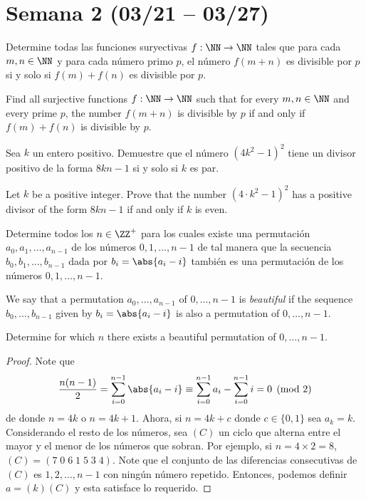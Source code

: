 \section{Semana 2 (03/21 -- 03/27)}


\begin{problem}
	Determine todas las funciones suryectivas $f:\NN\to\NN$ tales que para cada $m,n\in\NN$ y para cada número primo $p$, el número $f(m+n)$ es divisible por $p$ si y solo si $f(m)+f(n)$ es divisible por $p$.
	\begin{hint}
		Find all surjective functions $f:\NN\to\NN$ such that for every $m,n\in\NN$ and every prime $p$, the number $f(m+n)$ is divisible by $p$ if and only if $f(m)+f(n)$ is divisible by $p$.
	\end{hint}
\end{problem}

\begin{problem}
	Sea $k$ un entero positivo. Demuestre que el número $(4k^2-1)^2$ tiene un divisor positivo de la forma $8kn-1$ si y solo si $k$ es par.
	\begin{hint}
		Let $k$ be a positive integer. Prove that the number $(4\cdot k^2-1)^2$ has a positive divisor of the form $8kn-1$ if and only if $k$ is even.
	\end{hint}
\end{problem}

\begin{probER}
	Determine todos los $n\in\ZZ^+$ para los cuales existe una permutación $a_0,a_1,\dots,a_{n-1}$ de los números $0,1,\dots,n-1$ de tal manera que la secuencia $b_0,b_1,\dots,b_{n-1}$ dada por $b_i=\abs{a_i-i}$ también es una permutación de los números $0,1,\dots,n-1$.
	\begin{hint}
		We say that a permutation $a_0,\dots,a_{n-1}$ of $0,\dots,n-1$ is \emph{beautiful} if the sequence $b_0,\dots,b_{n-1}$ given by $b_i=\abs{a_i-i}$ is also a permutation of $0,\dots,n-1$.

		Determine for which $n$ there exists a beautiful permutation of $0,\dots,n-1$.
	\end{hint}
\end{probER}

\begin{proof}
	Note que
	\[\frac{n(n-1)}{2}=\sum_{i=0}^{n-1}\abs{a_i-i}\equiv\sum_{i=0}^{n-1}a_i-\sum_{i=0}^{n-1}i=0\pmod 2\]
	de donde $n=4k$ o $n=4k+1$. Ahora, si $n=4k+c$ donde $c\in\{0,1\}$ sea $a_k=k$. Considerando el resto de los números, sea $(C)$ un ciclo que alterna entre el mayor y el menor de los números que sobran. Por ejemplo, si $n=4\times 2=8$, $(C)=(7\;0\;6\;1\;5\;3\;4)$. Note que el conjunto de las diferencias consecutivas de $(C)$ es $1,2,\dots,n-1$ con ningún número repetido. Entonces, podemos definir $a=(k)(C)$ y esta satisface lo requerido.
\end{proof}

